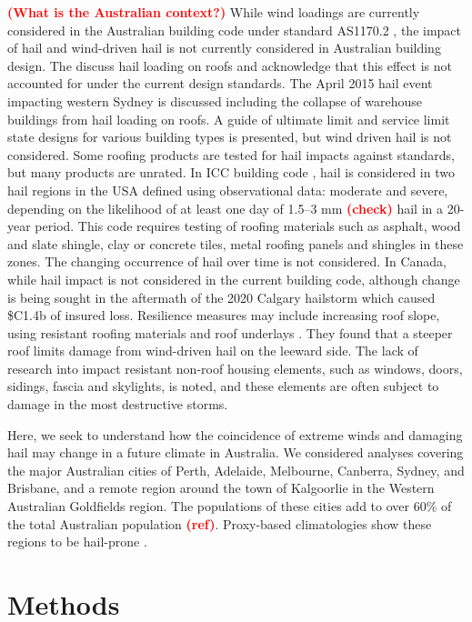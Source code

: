 \documentclass[]{agujournal2019}\usepackage[]{graphicx}\usepackage[]{xcolor}
\newcommand*{\todo}[1]{\textbf{\textcolor{red}{(#1)}}}
\newcommand*{\mref}{\todo{ref}}
\begin{document}
\todo{What is the Australian context?} While wind loadings are currently considered in the Australian building code \cite{ABCB_2024} under standard AS1170.2 \cite{Standards_2021}, the impact of hail and wind-driven hail is not currently considered in Australian building design. The  discuss hail loading on roofs and acknowledge that this effect is not accounted for under the current design standards. The April 2015 hail event impacting western Sydney is discussed including the collapse of warehouse buildings from hail loading on roofs. A guide of ultimate limit and service limit state designs for various building types is presented, but wind driven hail is not considered. Some roofing products are tested for hail impacts against standards, but many products are unrated. In ICC building code \cite{ICC_2008}, hail is considered in two hail regions in the USA defined using observational data: moderate and severe, depending on the likelihood of at least one day of 1.5--3 mm \todo{check} hail in a 20-year period. This code requires testing of roofing materials such as asphalt, wood and slate shingle, clay or concrete tiles, metal roofing panels and shingles in these zones. The changing occurrence of hail over time is not considered. In Canada, while hail impact is not considered in the current building code, although change is being sought in the aftermath of the 2020 Calgary hailstorm which caused \$C1.4b of insured loss. Resilience measures may include increasing roof slope, using resistant roofing materials and roof underlays \cite{ICLR_2018}. They found that a steeper roof limits damage from wind-driven hail on the leeward side. The lack of research into impact resistant non-roof housing elements, such as windows, doors, sidings, fascia and skylights, is noted, and these elements are often subject to damage in the most destructive storms.

Here, we seek to understand how the coincidence of extreme winds and damaging hail may change in a future climate in Australia. We considered analyses covering the major Australian cities of Perth, Adelaide, Melbourne, Canberra, Sydney, and Brisbane, and a remote region around the town of Kalgoorlie in the Western Australian Goldfields region. The populations of these cities add to over 60\% of the total Australian population \mref{}. Proxy-based climatologies show these regions to be hail-prone \cite{Raupach_npjCAS_2023}.

\section{Methods}
\end{document}
